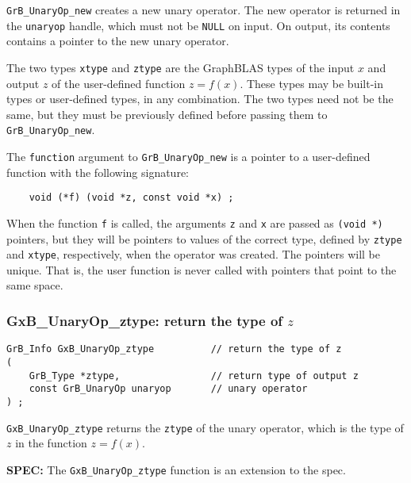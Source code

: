 \documentclass[12pt]{article}
\begin{document}
\verb'GrB_UnaryOp_new' creates a new unary operator.  The new operator is
returned in the \verb'unaryop' handle, which must not be \verb'NULL' on input.
On output, its contents contains a pointer to the new unary operator.

The two types \verb'xtype' and \verb'ztype' are the GraphBLAS types of the
input $x$ and output $z$ of the user-defined function $z=f(x)$.  These types
may be built-in types or user-defined types, in any combination.  The two types
need not be the same, but they must be previously defined before passing them
to \verb'GrB_UnaryOp_new'.

The \verb'function' argument to \verb'GrB_UnaryOp_new' is a pointer to a
user-defined function with the following signature:

    {\footnotesize
    \begin{verbatim}
    void (*f) (void *z, const void *x) ; \end{verbatim} }

When the function \verb'f' is called, the arguments \verb'z' and \verb'x' are
passed as \verb'(void *)' pointers, but they will be pointers to values of the
correct type, defined by \verb'ztype' and \verb'xtype', respectively, when the
operator was created.  The pointers will be unique.  That is, the user function
is never called with pointers that point to the same space.

\newpage
\subsubsection{{\sf GxB\_UnaryOp\_ztype:} return the type of $z$} 
\label{unaryop_ztype}

\begin{mdframed}[userdefinedwidth=6in]
{\footnotesize
\begin{verbatim}
GrB_Info GxB_UnaryOp_ztype          // return the type of z
(
    GrB_Type *ztype,                // return type of output z
    const GrB_UnaryOp unaryop       // unary operator
) ;
\end{verbatim}
}\end{mdframed}

\verb'GxB_UnaryOp_ztype' returns the \verb'ztype' of the unary operator, which
is the type of $z$ in the function $z=f(x)$.

\begin{spec}
{\bf SPEC:} The \verb'GxB_UnaryOp_ztype' function is an extension to the spec.
\end{spec}
\end{document}
